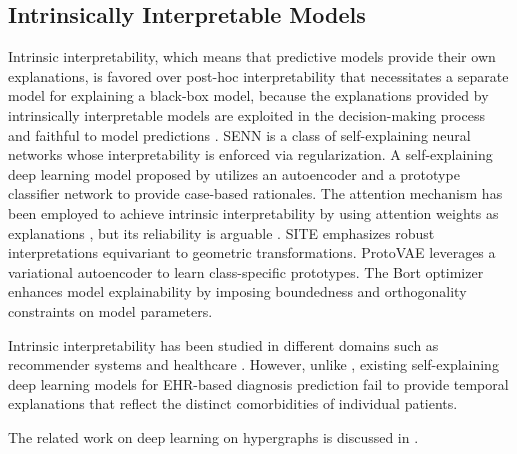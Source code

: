 \subsection{Intrinsically Interpretable Models}
Intrinsic interpretability, which means that predictive models provide their own explanations, is favored over post-hoc interpretability that necessitates a separate model for explaining a black-box model, because the explanations provided by intrinsically interpretable models are exploited in the decision-making process and faithful to model predictions \citep{ii:1, ii:2}. SENN \citep{using:4} is a class of self-explaining neural networks whose interpretability is enforced via regularization. A self-explaining deep learning model proposed by \citet{using:5} utilizes an autoencoder and a prototype classifier network to provide case-based rationales. The attention mechanism has been employed to achieve intrinsic interpretability by using attention weights as explanations \citep{ii:6}, but its reliability is arguable \citep{ii:7, ii:10, ii:11}. SITE \citep{ii:4} emphasizes robust interpretations equivariant to geometric transformations. ProtoVAE \citep{ii:5} leverages a variational autoencoder to learn class-specific prototypes. The Bort optimizer \citep{ii:9} enhances model explainability by imposing boundedness and orthogonality constraints on model parameters.

Intrinsic interpretability has been studied in different domains such as recommender systems \citep{ii:8} and healthcare \citep{ehr:17}. However, unlike \method, existing self-explaining deep learning models for EHR-based diagnosis prediction fail to provide temporal explanations that reflect the distinct comorbidities of individual patients.

The related work on deep learning on hypergraphs is discussed in .